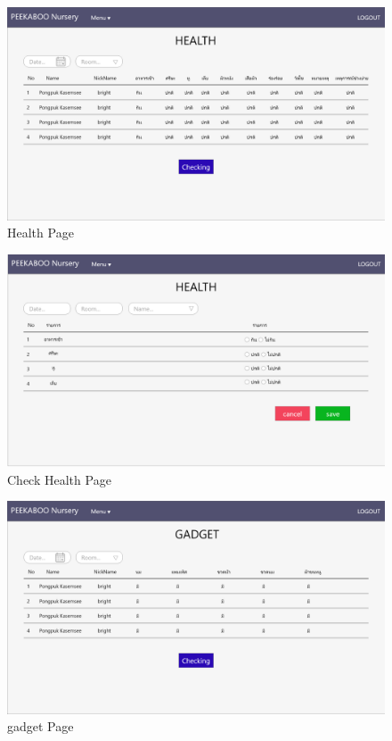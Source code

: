 \begin{figure}
  \begin{center}
  \includegraphics[width=140mm]{images/HealthPage.png}
  \end{center}
  \caption[Poem]{Health Page}
  \label{fig:walrus}
  \end{figure}

\begin{figure}
  \begin{center}
  \includegraphics[width=140mm]{images/HealthPageChecking.png}
  \end{center}
  \caption[Poem]{Check Health Page}
  \label{fig:walrus}
  \end{figure}

\begin{figure}
  \begin{center}
  \includegraphics[width=140mm]{images/gadgetPage.png}
  \end{center}
  \caption[Poem]{gadget Page}
  \label{fig:walrus}
  \end{figure}

